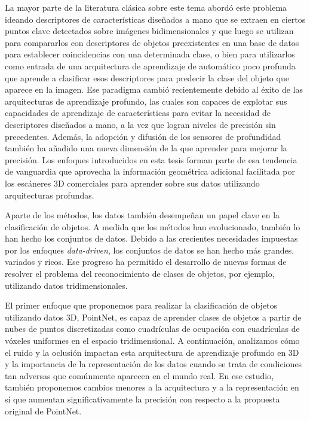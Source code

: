La mayor parte de la literatura clásica sobre este tema abordó este problema ideando descriptores de características diseñados a mano que se extraen en ciertos puntos clave detectados sobre imágenes bidimensionales y que luego se utilizan para compararlos con descriptores de objetos preexistentes en una base de datos para establecer coincidencias con una determinada clase, o bien para utilizarlos como entrada de una arquitectura de aprendizaje de automático poco profunda que aprende a clasificar esos descriptores para predecir la clase del objeto que aparece en la imagen. Ese paradigma cambió recientemente debido al éxito de las arquitecturas de aprendizaje profundo, las cuales son capaces de explotar sus capacidades de aprendizaje de características para evitar la necesidad de descriptores diseñados a mano, a la vez que logran niveles de precisión sin precedentes. Además, la adopción y difusión de los sensores de profundidad también ha añadido una nueva dimensión de la que aprender para mejorar la precisión. Los enfoques introducidos en esta tesis forman parte de esa tendencia de vanguardia que aprovecha la información geométrica adicional facilitada por los escáneres 3D comerciales para aprender sobre sus datos utilizando arquitecturas profundas.

Aparte de los métodos, los datos también desempeñan un papel clave en la clasificación de objetos. A medida que los métodos han evolucionado, también lo han hecho los conjuntos de datos. Debido a las crecientes necesidades impuestas por los enfoques \emph{data-driven}, los conjuntos de datos se han hecho más grandes, variados y ricos. Ese progreso ha permitido el desarrollo de nuevas formas de resolver el problema del reconocimiento de clases de objetos, por ejemplo, utilizando datos tridimensionales.

El primer enfoque que proponemos para realizar la clasificación de objetos utilizando datos 3D, PointNet, es capaz de aprender clases de objetos a partir de nubes de puntos discretizadas como cuadrículas de ocupación con cuadrículas de vóxeles uniformes en el espacio tridimensional. A continuación, analizamos cómo el ruido y la oclusión impactan esta arquitectura de aprendizaje profundo en 3D y la importancia de la representación de los datos cuando se trata de condiciones tan adversas que comúnmente aparecen en el mundo real. En ese estudio, también proponemos cambios menores a la arquitectura y a la representación en sí que aumentan significativamente la precisión con respecto a la propuesta original de PointNet.